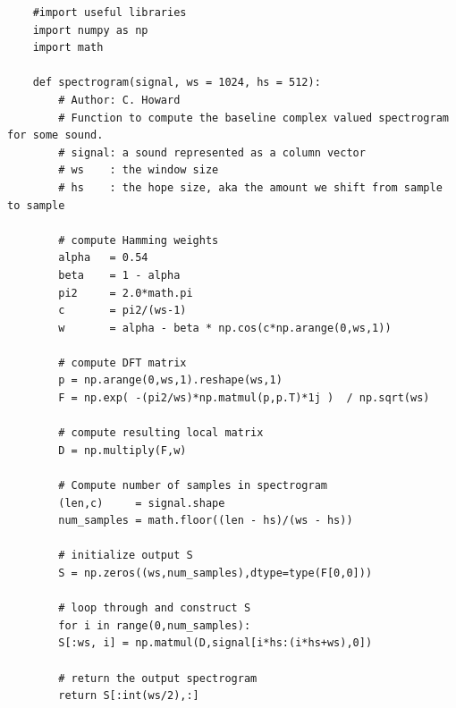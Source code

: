 \documentclass{article}[12pt]
\begin{document}
   \newpage
   \begin{verbatim}
    #import useful libraries
    import numpy as np
    import math

    def spectrogram(signal, ws = 1024, hs = 512):
        # Author: C. Howard
        # Function to compute the baseline complex valued spectrogram for some sound.
        # signal: a sound represented as a column vector
        # ws    : the window size
        # hs    : the hope size, aka the amount we shift from sample to sample

        # compute Hamming weights
        alpha   = 0.54
        beta    = 1 - alpha
        pi2     = 2.0*math.pi
        c       = pi2/(ws-1)
        w       = alpha - beta * np.cos(c*np.arange(0,ws,1))

        # compute DFT matrix
        p = np.arange(0,ws,1).reshape(ws,1)
        F = np.exp( -(pi2/ws)*np.matmul(p,p.T)*1j )  / np.sqrt(ws)

        # compute resulting local matrix
        D = np.multiply(F,w)

        # Compute number of samples in spectrogram
        (len,c)     = signal.shape
        num_samples = math.floor((len - hs)/(ws - hs))

        # initialize output S
        S = np.zeros((ws,num_samples),dtype=type(F[0,0]))

        # loop through and construct S
        for i in range(0,num_samples):
        S[:ws, i] = np.matmul(D,signal[i*hs:(i*hs+ws),0])

        # return the output spectrogram
        return S[:int(ws/2),:]
\end{verbatim}
   
\end{document}
